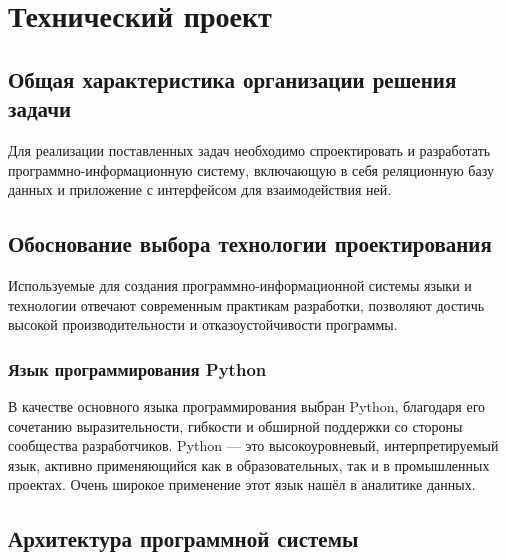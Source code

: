 \section{Технический проект}
\subsection{Общая характеристика организации решения задачи}

Для реализации поставленных задач необходимо спроектировать и разработать программно-информационную систему, включающую в себя реляционную базу данных и приложение с интерфейсом для взаимодействия ней.

\subsection{Обоснование выбора технологии проектирования}

Используемые для создания программно-информационной системы языки и технологии отвечают современным практикам разработки, позволяют достичь высокой производительности и отказоустойчивости программы.

\subsubsection{Язык программирования Python}

В качестве основного языка программирования выбран Python, благодаря его сочетанию выразительности, гибкости и обширной поддержки со стороны сообщества разработчиков. Python — это высокоуровневый, интерпретируемый язык, активно применяющийся как в образовательных, так и в промышленных проектах. Очень широкое применение этот язык нашёл в аналитике данных.

\subsection{Архитектура программной системы}

